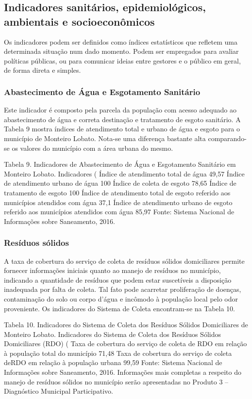 \subsection{Indicadores sanitários, epidemiológicos, ambientais e socioeconômicos}
Os indicadores podem ser definidos como índices estatísticos que refletem uma determinada situação num dado momento. Podem ser empregados para avaliar políticas públicas, ou para comunicar ideias entre gestores e o público em geral, de forma direta e simples.
\subsubsection{Abastecimento de Água e Esgotamento Sanitário}
Este indicador é composto pela parcela da população com acesso adequado ao abastecimento de água e correta destinação e tratamento de esgoto sanitário. A Tabela 9 mostra índices de atendimento total e urbano de água e esgoto para o município de Monteiro Lobato. Nota-se uma diferença bastante alta comparando-se os valores do município com a área urbana do mesmo.



Tabela 9. Indicadores de Abastecimento de Água e Esgotamento Sanitário em Monteiro Lobato.
Indicadores 	(%
Índice de atendimento total de água	49,57
Índice de atendimento urbano de água	100
Índice de coleta de esgoto	78,65
Índice de tratamento de esgoto	100
Índice de atendimento total de esgoto referido aos municípios atendidos com água	37,1
Índice de atendimento urbano de esgoto referido aos municípios atendidos com água	85,97
Fonte: Sistema Nacional de Informações sobre Saneamento, 2016.

\subsubsection{Resíduos sólidos}
A taxa de cobertura do serviço de coleta de resíduos sólidos domiciliares permite fornecer informações iniciais quanto ao manejo de resíduos no município, indicando a quantidade de resíduos que podem estar suscetíveis a disposição inadequada por falta de coleta. Tal fato pode acarretar proliferação de doenças, contaminação do solo ou corpo d’água e incômodo à população local pelo odor proveniente. Os indicadores do Sistema de Coleta encontram-se na Tabela 10.

Tabela 10. Indicadores do Sistema de Coleta dos Resíduos Sólidos Domiciliares de Monteiro Lobato.
Indicadores do Sistema de Coleta dos Resíduos Sólidos Domiciliares (RDO) (%
Taxa de cobertura do serviço de coleta de RDO em relação à população total do município	71,48
Taxa de cobertura do serviço de coleta deRDO em relação à população urbana	99,59
Fonte: Sistema Nacional de Informações sobre Saneamento, 2016.
Informações mais completas a respeito do manejo de resíduos sólidos no município serão apresentadas no Produto 3 – Diagnóstico Municipal Participativo. 

